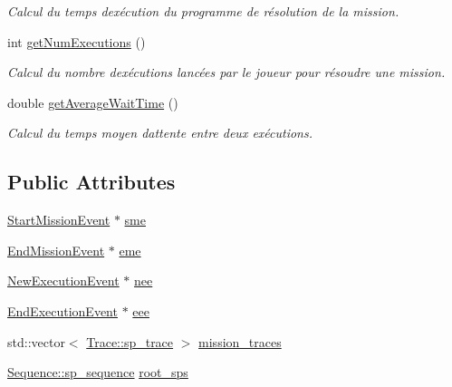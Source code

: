 \begin{DoxyCompactItemize}
\begin{DoxyCompactList}\small\item\em Calcul du temps d\textquotesingle{}exécution du programme de résolution de la mission. \end{DoxyCompactList}\item 
int \hyperlink{struct_traces_analyser_1_1_game_infos_a41d562577af62e38a8c0b8d9aa9f9ce7}{get\+Num\+Executions} ()
\begin{DoxyCompactList}\small\item\em Calcul du nombre d\textquotesingle{}exécutions lancées par le joueur pour résoudre une mission. \end{DoxyCompactList}\item 
double \hyperlink{struct_traces_analyser_1_1_game_infos_abd4e2397d4f2fa5e290420ad9fe93019}{get\+Average\+Wait\+Time} ()
\begin{DoxyCompactList}\small\item\em Calcul du temps moyen d\textquotesingle{}attente entre deux exécutions. \end{DoxyCompactList}\end{DoxyCompactItemize}
\subsection*{Public Attributes}
\begin{DoxyCompactItemize}
\item 
\hyperlink{class_start_mission_event}{Start\+Mission\+Event} $\ast$ \hyperlink{struct_traces_analyser_1_1_game_infos_ae14dc2f1fb7fd6f6ebc774adcc7453ff}{sme}
\item 
\hyperlink{class_end_mission_event}{End\+Mission\+Event} $\ast$ \hyperlink{struct_traces_analyser_1_1_game_infos_a626886085d8342aaa0bb35d4ef768a2d}{eme}
\item 
\hyperlink{class_new_execution_event}{New\+Execution\+Event} $\ast$ \hyperlink{struct_traces_analyser_1_1_game_infos_a9536f8b96fa309397655264cc2983063}{nee}
\item 
\hyperlink{class_end_execution_event}{End\+Execution\+Event} $\ast$ \hyperlink{struct_traces_analyser_1_1_game_infos_ad8bab50191b3a7d55dbeb60b88e12de7}{eee}
\item 
std\+::vector$<$ \hyperlink{class_trace_a9c58e523529fc8a03fb6acf3eef86150}{Trace\+::sp\+\_\+trace} $>$ \hyperlink{struct_traces_analyser_1_1_game_infos_a97beef39c7cb8d643ba4f11de8b7073b}{mission\+\_\+traces}
\item 
\hyperlink{class_sequence_a796bfa70aa4ddd4e447c210655b5dc5a}{Sequence\+::sp\+\_\+sequence} \hyperlink{struct_traces_analyser_1_1_game_infos_a674838500aafddb2a17153413708be08}{root\+\_\+sps}
\end{DoxyCompactItemize}


